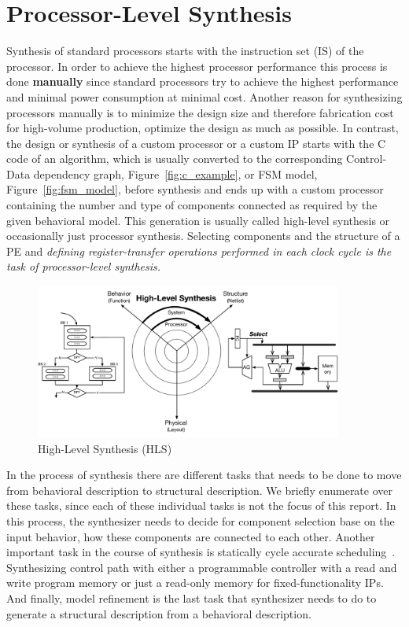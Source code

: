 \section{Processor-Level Synthesis}

Synthesis of standard processors starts with the instruction set (IS) of the processor.
In order to achieve the highest processor performance this process is done \textbf{manually} since standard processors try to achieve the highest performance and minimal power consumption at minimal cost.
Another reason for synthesizing processors manually is to minimize the design size and therefore fabrication cost for high-volume production, optimize the design as much as possible.
In contrast, the design or synthesis of a custom processor or a custom IP starts with the C code of an algorithm, which is usually converted to the corresponding Control-Data dependency graph, Figure~\ref{fig:c_example}, or FSM model, Figure~\ref{fig:fsm_model}, before synthesis and ends up with a custom processor containing the number and type of components connected as required by the given behavioral model.
This generation is usually called high-level synthesis or occasionally just processor synthesis.
Selecting components and the structure of a PE and \emph{defining register-transfer operations performed in each clock cycle is the task of processor-level synthesis.}

\begin{figure}[h]
    \centering
    \includegraphics[width=0.9\textwidth]{figures/Introduction/processor-synthesis.pdf}
    \caption{High-Level Synthesis (HLS)}
    \label{fig:proc_synthesis}
\end{figure}

In the process of synthesis there are different tasks that needs to be done to move from behavioral description to structural description.
We briefly enumerate over these tasks, since each of these individual tasks is not the focus of this report.
In this process, the synthesizer needs to decide for component selection base on the input behavior, how these components are connected to each other.
Another important task in the course of synthesis is statically cycle accurate scheduling~\cite{canis_2014_modulo,cong_2009_scheduling,cong_2008_scheduling, cong_2006_efficient}.
Synthesizing control path with either a programmable controller with a read and write program memory or just a read-only memory for fixed-functionality IPs.
And finally, model refinement is the last task that synthesizer needs to do to generate a structural description from a behavioral description.


